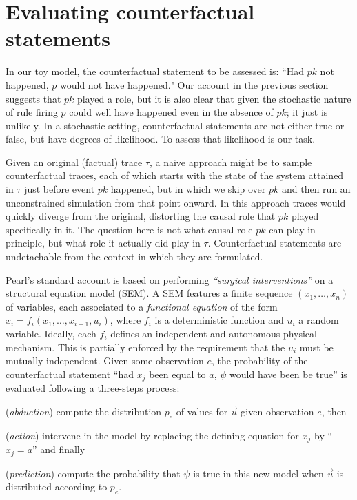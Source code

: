 
\newcommand{\PCFST}[0]{\ProbParen{\CFST{}}}

\newcommand{\ItAbduction}[0]{(\textit{abduction})}
\newcommand{\ItAction}[0]{(\textit{action})}
\newcommand{\ItPrediction}[0]{(\textit{prediction})}


\section{Evaluating counterfactual
  statements}\label{sec:counterfactual}

In our toy model, the counterfactual statement to be
assessed is: ``Had $pk$ not happened, $p$ would not have happened."
Our account in the previous section suggests that $pk$ played a role,
but it is also clear that given the stochastic nature of rule firing
$p$ could well have happened even in the absence of $pk$; it just is
unlikely. In a stochastic setting, counterfactual statements are not
either true or false, but have degrees of likelihood. To assess that
likelihood is our task.

Given an original (factual) trace $\tau$, a naive approach might be to sample
counterfactual traces, each of which starts with the state of the system
attained in $\tau$ just before event $pk$ happened, but in which we skip over
$pk$ and then run an unconstrained simulation from that point onward. In this
approach traces would quickly diverge from the original, distorting the causal
role that $pk$ played specifically in it. The question here is not what causal
role $pk$ can play in principle, but what role it actually did play in $\tau$.
Counterfactual statements are undetachable from the context in which they are
formulated.

Pearl's standard account 
\cite{pearl2009causality} is based on performing \textit{``surgical
  interventions''} on a structural equation model (SEM). A SEM
features a finite sequence $(x_1, \dots, x_n)$ of variables, each
associated to a \emph{functional equation} of the form
$x_i = f_i(x_1, \dots, x_{i-1}, u_i)$, where $f_i$ is a deterministic
function and $u_i$ a random variable. Ideally, each $f_i$ defines
an independent and autonomous physical mechanism. This is partially
enforced by the requirement that the $u_i$ must be mutually
independent. Given some observation $e$, the probability of the
counterfactual statement ``had $x_j$ been equal to $a$, $\psi$ would
have been be true'' is evaluated following a three-steps process:
\begin{inparaenum}[]
\item \ItAbduction{} compute the distribution $p_e$ of values for
  $\vec u$ given observation $e$, then
\item \ItAction{} intervene in the model by replacing the defining
  equation for $x_j$ by ``$x_j = a$'' and finally
\item \ItPrediction{} compute the probability that $\psi$ is true in
  this new model when $\vec{u}$ is distributed according to $p_e$.
\end{inparaenum}

